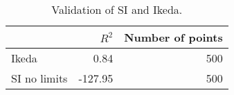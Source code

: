 
\begin{table}[H]
    \centering
    \caption{Validation of SI and Ikeda.}
   \begin{tabular}{lrr}
\toprule
{} &   $R^2$ &  Number of points \\
\midrule
Ikeda        &    0.84 &               500 \\
SI no limits & -127.95 &               500 \\
\bottomrule
\end{tabular}

    \label{tab:si_ikeda_validation}
\end{table}
    